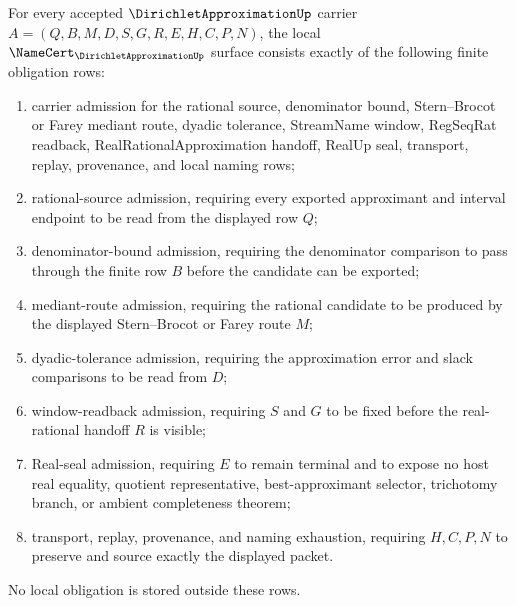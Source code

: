 \begin{theorem}
\label{thm:dirichlet-approximation-namecert-obligations}
For every accepted $\DirichletApproximationUp$ carrier $A=(Q,B,M,D,S,G,R,E,H,C,P,N)$, the local $\NameCert_{\DirichletApproximationUp}$ surface consists exactly of the following finite obligation rows:
\begin{enumerate}
\item carrier admission for the rational source, denominator bound, Stern--Brocot or Farey mediant route, dyadic tolerance, StreamName window, RegSeqRat readback, RealRationalApproximation handoff, RealUp seal, transport, replay, provenance, and local naming rows;
\item rational-source admission, requiring every exported approximant and interval endpoint to be read from the displayed row $Q$;
\item denominator-bound admission, requiring the denominator comparison to pass through the finite row $B$ before the candidate can be exported;
\item mediant-route admission, requiring the rational candidate to be produced by the displayed Stern--Brocot or Farey route $M$;
\item dyadic-tolerance admission, requiring the approximation error and slack comparisons to be read from $D$;
\item window-readback admission, requiring $S$ and $G$ to be fixed before the real-rational handoff $R$ is visible;
\item Real-seal admission, requiring $E$ to remain terminal and to expose no host real equality, quotient representative, best-approximant selector, trichotomy branch, or ambient completeness theorem;
\item transport, replay, provenance, and naming exhaustion, requiring $H,C,P,N$ to preserve and source exactly the displayed packet.
\end{enumerate}
No local obligation is stored outside these rows.
\end{theorem}

